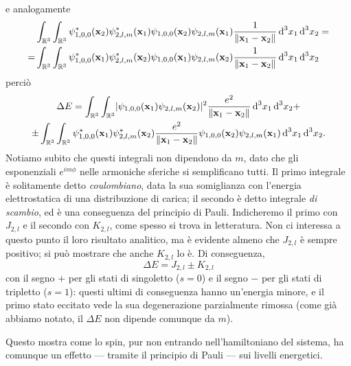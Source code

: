 e analogamente
\begin{equation}
    \begin{aligned}
        &\int_{\mathbb{R}^3}\int_{\mathbb{R}^3}
            \psi_{1,0,0}^*(\mathbf{x}_2)\psi_{2,l,m}^*(\mathbf{x}_1)\psi_{1,0,0}(\mathbf{x}_2)\psi_{2,l,m}(\mathbf{x}_1)
            \frac1{\lVert\mathbf{x}_1-\mathbf{x}_2\rVert}
        \,\textup{d}^3 x_1\,\textup{d}^3 x_2=\\
        =&\int_{\mathbb{R}^3}\int_{\mathbb{R}^3}
            \psi_{1,0,0}^*(\mathbf{x}_1)\psi_{2,l,m}^*(\mathbf{x}_2)\psi_{1,0,0}(\mathbf{x}_1)\psi_{2,l,m}(\mathbf{x}_2)
            \frac1{\lVert\mathbf{x}_1-\mathbf{x}_2\rVert}
        \,\textup{d}^3 x_1\,\textup{d}^3 x_2
    \end{aligned}
\end{equation}
perciò
\begin{multline}
    \Delta E=
    \int_{\mathbb{R}^3}\int_{\mathbb{R}^3}
        \lvert\psi_{1,0,0}(\mathbf{x}_1)\psi_{2,l,m}(\mathbf{x}_2)\rvert^2
        \frac{e^2}{\lVert\mathbf{x}_1-\mathbf{x}_2\rVert}
    \,\textup{d}^3 x_1\,\textup{d}^3 x_2
    + \\ \pm
    \int_{\mathbb{R}^3}\int_{\mathbb{R}^3}
        \psi_{1,0,0}^*(\mathbf{x}_1)\psi_{2,l,m}^*(\mathbf{x}_2)
        \frac{e^2}{\lVert\mathbf{x}_1-\mathbf{x}_2\rVert}
        \psi_{1,0,0}(\mathbf{x}_2)\psi_{2,l,m}(\mathbf{x}_1)
    \,\textup{d}^3 x_1\,\textup{d}^3 x_2.
\end{multline}
Notiamo subito che questi integrali non dipendono da $m$, dato che gli esponenziali $e^{im\phi}$ nelle armoniche sferiche si semplificano tutti.
Il primo integrale è solitamente detto \emph{coulombiano}, data la sua somiglianza con l'energia elettrostatica di una distribuzione di carica; il secondo è detto integrale \emph{di scambio}, ed è una conseguenza del principio di Pauli.
Indicheremo il primo con $J_{2,l}$ e il secondo con $K_{2,l}$, come spesso si trova in letteratura.
Non ci interessa a questo punto il loro risultato analitico, ma è evidente almeno che $J_{2,l}$ è sempre positivo; si può mostrare che anche $K_{2,l}$ lo è.
Di conseguenza,
\begin{equation}
    \Delta E=J_{2,l}\pm K_{2,l}
\end{equation}
con il segno $+$ per gli stati di singoletto ($s=0$) e il segno $-$ per gli stati di tripletto ($s=1$): questi ultimi di conseguenza hanno un'energia minore, e il primo stato eccitato vede la sua degenerazione parzialmente rimossa (come già abbiamo notato, il $\Delta E$ non dipende comunque da $m$).

Questo mostra come lo spin, pur non entrando nell'hamiltoniano del sistema, ha comunque un effetto --- tramite il principio di Pauli --- sui livelli energetici.
